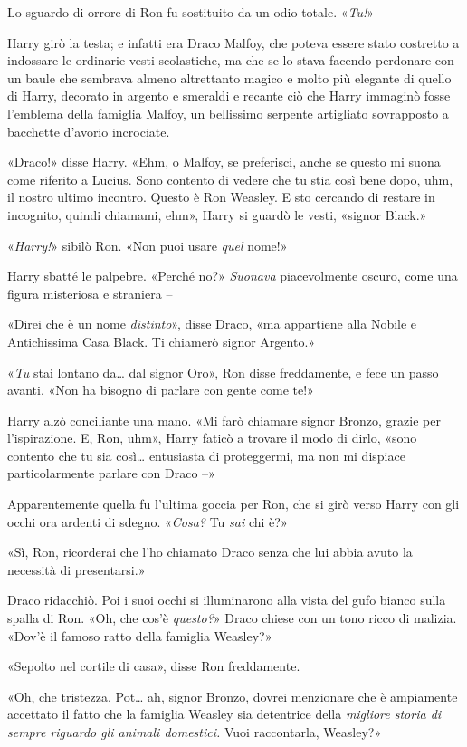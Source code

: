 Lo sguardo di orrore di Ron fu sostituito da un odio totale. «\textit{Tu!}»

Harry girò la testa; e infatti era Draco Malfoy, che poteva essere stato costretto a indossare le ordinarie vesti scolastiche, ma che se lo stava facendo perdonare con un baule che sembrava almeno altrettanto magico e molto più elegante di quello di Harry, decorato in argento e smeraldi e recante ciò che Harry immaginò fosse l’emblema della famiglia Malfoy, un bellissimo serpente artigliato sovrapposto a bacchette d’avorio incrociate.

«Draco!» disse Harry. «Ehm, o Malfoy, se preferisci, anche se questo mi suona come riferito a Lucius. Sono contento di vedere che tu stia così bene dopo, uhm, il nostro ultimo incontro. Questo è Ron Weasley. E sto cercando di restare in incognito, quindi chiamami, ehm», Harry si guardò le vesti, «signor Black.»

«\textit{Harry!}» sibilò Ron. «Non puoi usare \textit{quel} nome!»

Harry sbatté le palpebre. «Perché no?» \textit{Suonava} piacevolmente oscuro, come una figura misteriosa e straniera –

«Direi che è un nome \textit{distinto}», disse Draco, «ma appartiene alla Nobile e Antichissima Casa Black. Ti chiamerò signor Argento.»

«\textit{Tu} stai lontano da… dal signor Oro», Ron disse freddamente, e fece un passo avanti. «Non ha bisogno di parlare con gente come te!»

Harry alzò conciliante una mano. «Mi farò chiamare signor Bronzo, grazie per l’ispirazione. E, Ron, uhm», Harry faticò a trovare il modo di dirlo, «sono contento che tu sia così… entusiasta di proteggermi, ma non mi dispiace particolarmente parlare con Draco –»

Apparentemente quella fu l’ultima goccia per Ron, che si girò verso Harry con gli occhi ora ardenti di sdegno. «\textit{Cosa?} Tu \textit{sai} chi è?»

«Sì, Ron, ricorderai che l’ho chiamato Draco senza che lui abbia avuto la necessità di presentarsi.»

Draco ridacchiò. Poi i suoi occhi si illuminarono alla vista del gufo bianco sulla spalla di Ron. «Oh, che cos’è \textit{questo?}» Draco chiese con un tono ricco di malizia. «Dov’è il famoso ratto della famiglia Weasley?»

«Sepolto nel cortile di casa», disse Ron freddamente.

«Oh, che tristezza. Pot… ah, signor Bronzo, dovrei menzionare che è ampiamente accettato il fatto che la famiglia Weasley sia detentrice della \textit{migliore storia di sempre riguardo gli animali domestici.} Vuoi raccontarla, Weasley?»

